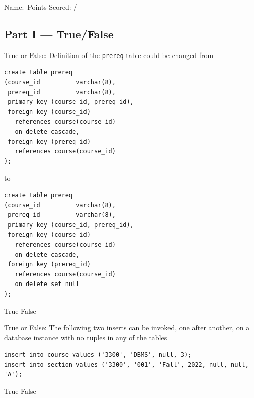 \documentclass[12pt, addpoints]{exam}
\begin{document}
\noindent Name:\ \makebox[3in]{\hrulefill}\hfill Points Scored: \underline{\hspace{3em}} / \numpoints
\begin{questions}

\section*{Part I — True/False}

\begin{minipage}{\linewidth}
\question[1]
True or False: Definition of the \texttt{prereq} table could be changed from\par\vspace{0.5em}
\begin{verbatim}
create table prereq
(course_id          varchar(8),
 prereq_id          varchar(8),
 primary key (course_id, prereq_id),
 foreign key (course_id) 
   references course(course_id)
   on delete cascade,
 foreign key (prereq_id)
   references course(course_id)
);
\end{verbatim}
\vspace{0.5em}
to\par\vspace{0.5em}
\begin{verbatim}
create table prereq
(course_id          varchar(8),
 prereq_id          varchar(8),
 primary key (course_id, prereq_id),
 foreign key (course_id) 
   references course(course_id)
   on delete cascade,
 foreign key (prereq_id)
   references course(course_id)
   on delete set null
);
\end{verbatim}
\vspace{0.5em}
\begin{checkboxes}
    \choice True
    \CorrectChoice False
\end{checkboxes}
\end{minipage}\vspace{1em}

\begin{minipage}{\linewidth}
\question[2]
True or False: The following two inserts can be invoked, one after another, on a database instance with no tuples in any of the tables\par\vspace{0.5em}
\begin{verbatim}
insert into course values ('3300', 'DBMS', null, 3);
insert into section values ('3300', '001', 'Fall', 2022, null, null, 'A');
\end{verbatim}
\begin{checkboxes}
    \CorrectChoice True
    \choice False
\end{checkboxes}
\end{minipage}\vspace{1em}


\end{questions}
\end{document}
